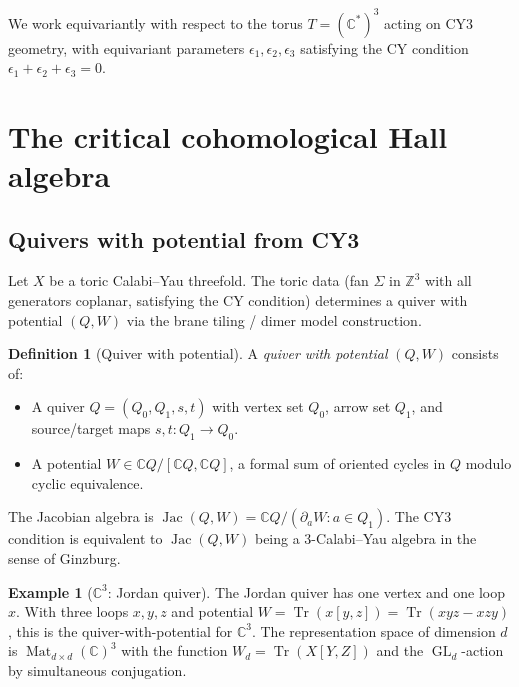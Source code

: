 \documentclass[11pt]{article}
\theoremstyle{definition}
\newtheorem{definition}[theorem]{Definition}
\newtheorem{example}[theorem]{Example}
\theoremstyle{remark}
\newcommand{\ZZ}{\mathbb{Z}}
\newcommand{\CC}{\mathbb{C}}
\newcommand{\Tr}{\operatorname{Tr}}
\newcommand{\GL}{\operatorname{GL}}
\begin{document}
\noindent
We work equivariantly with respect to the torus $T = (\CC^*)^3$ acting on CY3
geometry, with equivariant parameters $\epsilon_1, \epsilon_2, \epsilon_3$
satisfying the CY condition $\epsilon_1 + \epsilon_2 + \epsilon_3 = 0$.


\section{The critical cohomological Hall algebra}
\label{sec:critical-coha}

\subsection{Quivers with potential from CY3}
\label{subsec:quiver-potential}

Let $X$ be a toric Calabi--Yau threefold. The toric data (fan $\Sigma$ in
$\ZZ^3$ with all generators coplanar, satisfying the CY condition) determines
a quiver with potential $(Q, W)$ via the brane tiling / dimer model construction.

\begin{definition}[Quiver with potential]
\label{def:quiver-potential}
A \emph{quiver with potential} $(Q, W)$ consists of:
\begin{itemize}
 \item A quiver $Q = (Q_0, Q_1, s, t)$ with vertex set $Q_0$, arrow set $Q_1$,
 and source/target maps $s, t \colon Q_1 \to Q_0$.
 \item A potential $W \in \CC Q / [\CC Q, \CC Q]$, a formal sum of oriented
 cycles in $Q$ modulo cyclic equivalence.
\end{itemize}
The Jacobian algebra is $\operatorname{Jac}(Q, W) = \CC Q / (\partial_a W : a \in Q_1)$.
The CY3 condition is equivalent to $\operatorname{Jac}(Q,W)$ being a
3-Calabi--Yau algebra in the sense of Ginzburg.
\end{definition}

\begin{example}[$\CC^3$: Jordan quiver]
\label{ex:jordan}
The Jordan quiver has one vertex and one loop $x$. With three loops
$x, y, z$ and potential $W = \Tr(x[y,z]) = \Tr(xyz - xzy)$, this is the
quiver-with-potential for $\CC^3$. The representation space of dimension
$d$ is $\operatorname{Mat}_{d \times d}(\CC)^3$ with the function
$W_d = \Tr(X[Y,Z])$ and the $\GL_d$-action by simultaneous conjugation.
\end{example}
\end{document}
